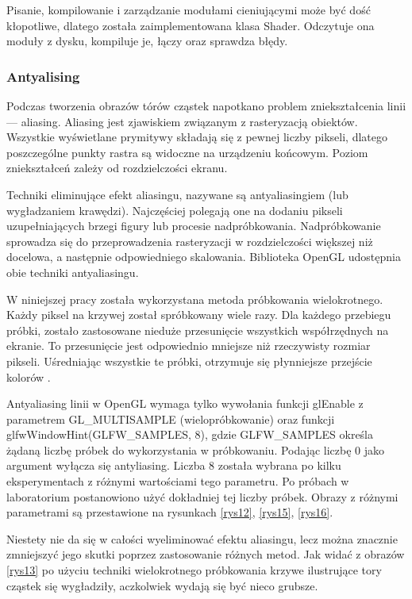 Pisanie, kompilowanie i zarządzanie modułami cieniującymi może być dość kłopotliwe, dlatego została zaimplementowana klasa Shader. Odczytuje ona moduły z dysku, kompiluje je, łączy oraz sprawdza błędy. 

\subsubsection{Antyalising}
Podczas tworzenia obrazów tórów cząstek napotkano problem zniekształcenia linii --- aliasing. Aliasing jest zjawiskiem związanym z rasteryzacją obiektów. Wszystkie wyświetlane prymitywy składają się z pewnej liczby pikseli, dlatego poszczególne punkty rastra są widoczne na urządzeniu końcowym. Poziom zniekształceń zależy od rozdzielczości ekranu. 

Techniki eliminujące efekt aliasingu, nazywane są antyaliasingiem (lub wygładzaniem krawędzi). Najczęściej polegają one na dodaniu pikseli uzupełniających brzegi figury lub procesie nadpróbkowania. Nadpróbkowanie sprowadza się do przeprowadzenia rasteryzacji w rozdzielczości większej niż docelowa, a następnie odpowiedniego skalowania. Biblioteka OpenGL udostępnia obie techniki antyaliasingu. 

W niniejszej pracy została wykorzystana metoda próbkowania wielokrotnego. Każdy piksel na krzywej został spróbkowany wiele razy. Dla każdego przebiegu próbki, zostało zastosowane nieduże przesunięcie wszystkich współrzędnych na ekranie. To przesunięcie jest odpowiednio mniejsze niż rzeczywisty rozmiar pikseli. Uśredniając wszystkie te próbki, otrzymuje się płynniejsze przejście kolorów \cite{glfw}. 

Antyaliasing linii w OpenGL wymaga tylko wywołania funkcji glEnable z parametrem GL\_MULTISAMPLE (wielopróbkowanie) oraz funkcji glfwWindowHint(GLFW\_SAMPLES, 8), gdzie GLFW\_SAMPLES określa żądaną liczbę próbek do wykorzystania w próbkowaniu. Podając liczbę 0 jako argument wyłącza się antyliasing. Liczba 8 została wybrana po kilku eksperymentach z różnymi wartościami tego parametru. Po próbach w laboratorium postanowiono użyć dokładniej tej liczby próbek. Obrazy z różnymi parametrami są przestawione na rysunkach \ref{rys12}, \ref{rys15}, \ref{rys16}.

Niestety nie da się w całości wyeliminować efektu aliasingu, lecz można znacznie zmniejszyć jego skutki poprzez zastosowanie różnych metod. Jak widać z obrazów \ref{rys13} po użyciu techniki wielokrotnego próbkowania krzywe ilustrujące tory cząstek się wygładziły, aczkolwiek wydają się być nieco grubsze.


